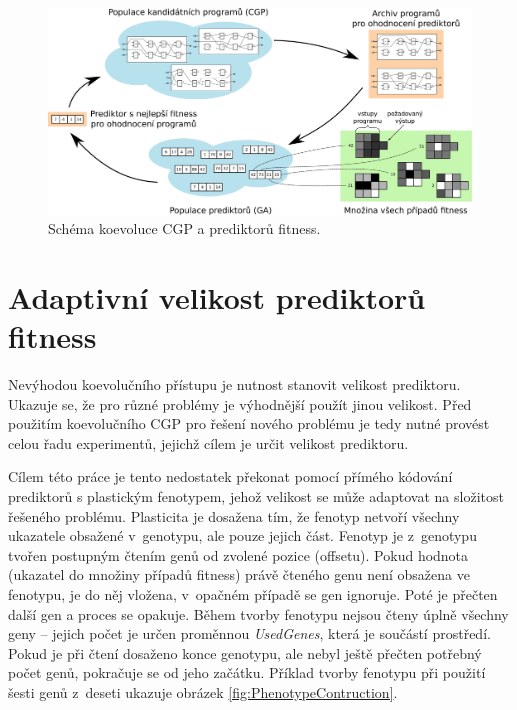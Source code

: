 \documentclass[fleqn,11pt]{ExcelAtFIT} %
\begin{document}
\begin{figure}[t]
    \centering\includegraphics[width=0.9\linewidth]{images/coevolution-if.pdf}
    \caption{Schéma koevoluce CGP a prediktorů fitness.}
    \label{fig:CoevolutionScheme}
\end{figure}



\section{Adaptivní velikost prediktorů fitness}
\label{sec:AdaptiveSize}

Nevýhodou koevolučního přístupu je nutnost stanovit velikost prediktoru. Ukazuje se, že pro různé problémy je výhodnější použít jinou velikost. Před použitím koevolučního CGP pro řešení nového problému je tedy nutné provést celou řadu experimentů, jejichž cílem je určit velikost prediktoru.

Cílem této práce je tento nedostatek překonat pomocí přímého kódování prediktorů s plastickým fenotypem, jehož velikost se může adaptovat na složitost řešeného problému. Plasticita je dosažena tím, že fenotyp netvoří všechny ukazatele obsažené v~genotypu, ale pouze jejich část. Fenotyp je z~genotypu tvořen postupným čtením genů od zvolené pozice (offsetu). Pokud hodnota (ukazatel do množiny případů fitness) právě čteného genu není obsažena ve fenotypu, je do něj vložena, v~opačném případě se gen ignoruje. Poté je přečten další gen a proces se opakuje. Během tvorby fenotypu nejsou čteny úplně všechny geny -- jejich počet je určen proměnnou \emph{UsedGenes}, která je součástí prostředí. Pokud je při čtení dosaženo konce genotypu, ale nebyl ještě přečten potřebný počet genů, pokračuje se od jeho začátku. Příklad tvorby fenotypu při použití šesti genů z~deseti ukazuje obrázek \ref{fig:PhenotypeContruction}.
\end{document}
